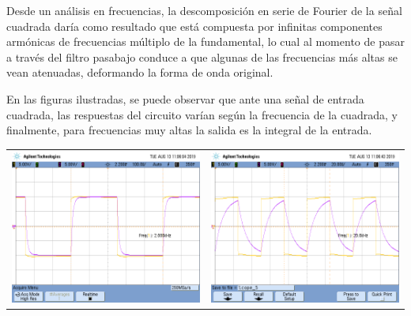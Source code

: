 Desde un an\'alisis en frecuencias, la descomposici\'on en serie de Fourier de la se\~nal cuadrada dar\'ia como resultado que est\'a compuesta por infinitas componentes arm\'onicas de frecuencias m\'ultiplo de la fundamental, lo cual al momento de pasar a trav\'es del filtro pasabajo conduce a que algunas de las frecuencias m\'as altas se vean atenuadas, deformando la forma de onda original.

En las figuras ilustradas, se puede observar que ante una se\~nal de entrada cuadrada, las respuestas del circuito var\'ian seg\'un la frecuencia de la cuadrada, y finalmente, para frecuencias muy altas la salida es la integral de la entrada.

\begin{tabular}{c c}
	\includegraphics[scale=0.21]{../Mediciones/Fotos/scope_4.png} & \includegraphics[scale=0.21]{../Mediciones/Fotos/scope_5.png}	\\

\end{tabular}
